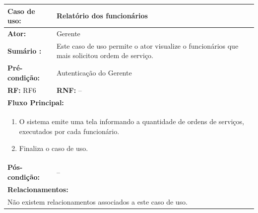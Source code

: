 \documentclass[
	12pt,				%
	openright,
	oneside,			%
	a4paper,			%
	chapter=TITLE,		%
	brazil				%
	]{abntex2}
\begin{document}
\begin{table}[h]
\centering
\begin{tabular}{|p{3cm}|p{3cm}|p{3cm}|p{3cm}|}
\hline
\textbf{Caso de uso:}             & \multicolumn{3}{p{9cm}|}{Relatório dos funcionários}				 \\ \hline
\textbf{Ator:}                 & \multicolumn{3}{p{9cm}|}{Gerente}         			          						 	\\ \hline
\textbf{Sumário :}                & \multicolumn{3}{p{9cm}|}{Este caso de uso permite o ator visualize %
													o funcionários que mais solicitou ordem de serviço.}         	\\ \hline
\textbf{Pré-condição:}            & \multicolumn{3}{p{9cm}|}{ Autenticação do Gerente }                				    \\ \hline
\multicolumn{2}{|p{6cm}|}{\textbf{RF:} RF6 }                  & \multicolumn{2}{p{6cm}|}{\textbf{RNF:} --}     	    \\ \hline
\multicolumn{4}{|p{12cm}|}{\textbf{Fluxo Principal:}}                                                					\\ \hline
\multicolumn{4}{|p{12cm}|}{%
\begin{enumerate}
  \item O sistema emite uma tela informando a quantidade de ordens de serviços, executados por cada funcionário.
  \item Finaliza o caso de uso.
\end{enumerate}}                                                               				 							\\ \hline
\textbf{Pós-condição: }  & \multicolumn{3}{p{9cm}|}{ -- }		\\ \hline
\multicolumn{4}{|p{12cm}|}{\textbf{Relacionamentos:}}                                        								\\ \hline
\multicolumn{4}{|p{12cm}|}{Não existem relacionamentos associados a este caso de uso.}                                  \\ \hline
\end{tabular}
\end{table}
\end{document}
